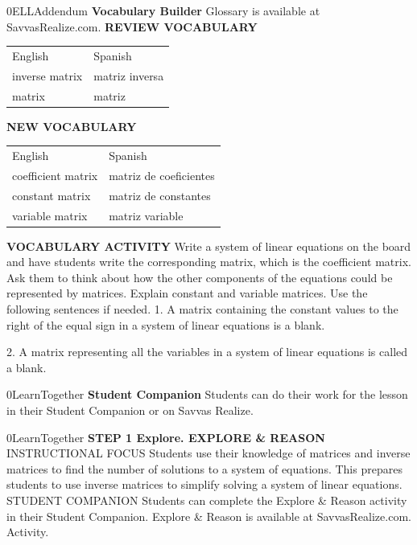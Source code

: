 \documentclass{article}
\newenvironment{te-addendum}[2]{}{}     %
\newcommand{\answer}[1]{}               %
\newcommand{\placeholder}[2]{}          %
\begin{document}
\begin{te-addendum}{0}{ELLAddendum}
\textbf{Vocabulary Builder}
Glossary is available at SavvasRealize.com.
\textbf{REVIEW VOCABULARY}
\begin{tabular}{ll}
English & Spanish \\
inverse matrix & matriz inversa \\
matrix & matriz \\
\end{tabular}
\textbf{NEW VOCABULARY}
\begin{tabular}{ll}
English & Spanish \\
coefficient matrix & matriz de coeficientes \\
constant matrix & matriz de constantes \\
variable matrix & matriz variable \\
\end{tabular}
\textbf{VOCABULARY ACTIVITY}
Write a system of linear equations on the board and have students write the corresponding matrix, which is the coefficient matrix. Ask them to think about how the other components of the equations could be represented by matrices. Explain constant and variable matrices. Use the following sentences if needed.
1. A matrix containing the constant values to the right of the equal sign in a system of linear equations is a blank.
\answer{constant matrix}
2. A matrix representing all the variables in a system of linear equations is called a blank.
\answer{variable matrix}
\end{te-addendum}
\begin{te-addendum}{0}{LearnTogether}
\textbf{Student Companion}
Students can do their work for the lesson in their Student Companion or on Savvas Realize.
\placeholder{illustration}{Student Companion cover, black background with purple and blue circular artwork, enVision Algebra 2, SAVVAS.}
\end{te-addendum}
\begin{te-addendum}{0}{LearnTogether}
\textbf{STEP 1 Explore. EXPLORE \& REASON}
INSTRUCTIONAL FOCUS Students use their knowledge of matrices and inverse matrices to find the number of solutions to a system of equations. This prepares students to use inverse matrices to simplify solving a system of linear equations.
STUDENT COMPANION Students can complete the Explore \& Reason activity in their Student Companion.
Explore \& Reason is available at SavvasRealize.com. Activity.
\end{te-addendum}
\end{document}
